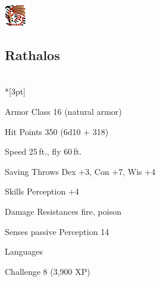 \begin{hbMonsterNoteWide}[b]
\begin{multicols}{2}
\begin{hbStatBlock}
\noindent\begin{minipage}[c]{1cm}%
\includegraphics[width=\linewidth]{assets/ext/icons/rathalos.png}%
\end{minipage}\hfill%
\begin{minipage}{\dimexpr -4pt-1cm+\linewidth}%
\subsection*{Rathalos}%
\end{minipage}\\*[3pt]
\begin{hbStatBlockDescription}
\item[Armor Class] 16 (natural armor)
\item[Hit Points] 350 (6d10 + 318)
\item[Speed] 25\,ft., fly 60\,ft.
\end{hbStatBlockDescription}
\SBSep
{}
\SBSep
\begin{hbStatBlockDescription}
\item[Saving Throws] Dex +3, Con +7, Wis +4
\item[Skills] Perception +4
\item[Damage Resistances] fire, poison
\item[Senses] passive Perception 14
\item[Languages] \hbNone
\item[Challenge] 8 (3,900 XP)
\end{hbStatBlockDescription}
\SBSep


\end{hbStatBlock}
\end{multicols}
\end{hbMonsterNoteWide}
